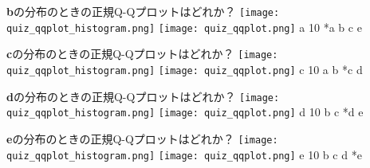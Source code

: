 \begin{quiz}{\MyClass}
\QuizMultipleChoices
{
  \textbf{b}の分布のときの正規Q-Qプロットはどれか？
  \texttt{[image: quiz\_qqplot\_histogram.png]}
  \texttt{[image: quiz\_qqplot.png]}
}
{
  a
}
{10}
{*a}
{ b}
{ c}
{ e}

\QuizMultipleChoices
{
  \textbf{c}の分布のときの正規Q-Qプロットはどれか？
  \texttt{[image: quiz\_qqplot\_histogram.png]}
  \texttt{[image: quiz\_qqplot.png]}
}
{
  c
}
{10}
{ a}
{ b}
{*c}
{ d}

\QuizMultipleChoices
{
  \textbf{d}の分布のときの正規Q-Qプロットはどれか？
  \texttt{[image: quiz\_qqplot\_histogram.png]}
  \texttt{[image: quiz\_qqplot.png]}
}
{
  d
}
{10}
{ b}
{ c}
{*d}
{ e}

\QuizMultipleChoices
{
  \textbf{e}の分布のときの正規Q-Qプロットはどれか？
  \texttt{[image: quiz\_qqplot\_histogram.png]}
  \texttt{[image: quiz\_qqplot.png]}
}
{
  e
}
{10}
{ b}
{ c}
{ d}
{*e}

\end{quiz}


